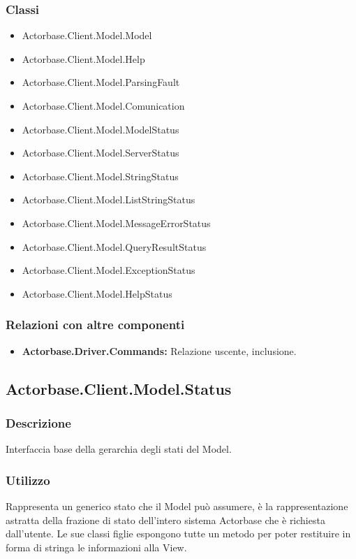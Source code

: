 \documentclass[a4paper]{article}
\begin{document}
		\subsubsection{Classi}
			\begin{itemize}
				\item Actorbase.Client.Model.Model
				\item Actorbase.Client.Model.Help
				\item Actorbase.Client.Model.ParsingFault
				\item Actorbase.Client.Model.Comunication
				\item Actorbase.Client.Model.ModelStatus
				\item Actorbase.Client.Model.ServerStatus
				\item Actorbase.Client.Model.StringStatus
				\item Actorbase.Client.Model.ListStringStatus
				\item Actorbase.Client.Model.MessageErrorStatus
				\item Actorbase.Client.Model.QueryResultStatus
				\item Actorbase.Client.Model.ExceptionStatus
				\item Actorbase.Client.Model.HelpStatus
			\end{itemize}
		\subsubsection{Relazioni con altre componenti}
				\begin{itemize}
					\item \textbf{Actorbase.Driver.Commands:} Relazione uscente, inclusione.
				\end{itemize}	
		
		\subsection{Actorbase.Client.Model.Status}
			\subsubsection{Descrizione}
				Interfaccia base della gerarchia degli stati del Model.
			\subsubsection{Utilizzo}
				Rappresenta un generico stato che il Model può assumere, è la rappresentazione astratta della frazione di stato dell'intero sistema Actorbase che è richiesta dall'utente. Le sue classi figlie espongono tutte un metodo per poter restituire in forma di stringa le informazioni alla View.
\end{document}
